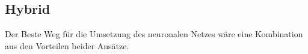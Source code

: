 

\subsection{Hybrid}
Der Beste Weg für die Umsetzung des neuronalen Netzes wäre eine Kombination aus den Vorteilen beider Ansätze.

